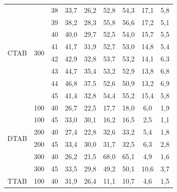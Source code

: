 \begin{table}[h]
{\begin{tabular}{ccccccccc}
        	\multirow{8}{*}{CTAB} & \multirow{8}{*}{300} &   38   &   33,7   &   26,2    &   52,8   &   54,3    &   17,1   &    5,8    \\
        	                      &                      &   39   &   38,2   &   28,3    &   55,8   &   56,6    &   17,2   &    5,1    \\
        	                      &                      &   40   &   40,0   &   29,7    &   52,5   &   54,0    &   15,7   &    5,5    \\
        	                      &                      &   41   &   41,7   &   31,9    &   52,7   &   53,0    &   14,8   &    5,4    \\
        	                      &                      &   42   &   42,9   &   32,8    &   53,7   &   53,2    &   14,1   &    6,3    \\
        	                      &                      &   43   &   44,7   &   35,4    &   53,2   &   52,9    &   13,8   &    6,8    \\
        	                      &                      &   44   &   46,8   &   37,5    &   52,6   &   50,9    &   13,2   &    6,9    \\
        	                      &                      &   45   &   41,4   &   32,8    &   54,4   &   55,2    &   15,4   &    5,8    \\ \midrule
        	\multirow{6}{*}{DTAB} &         100          &   40   &   26,7   &   22,5    &   17,7   &   18,0    &   6,0    &    1,9    \\
        	                      &         100          &   45   &   33,0   &   30,1    &   16,2   &   16,5    &   2,5    &    1,1    \\
        	                      &         200          &   40   &   27,4   &   22,8    &   32,6   &   33,2    &   5,4    &    1,8    \\
        	                      &         200          &   45   &   33,4   &   30,0    &   31,7   &   32,5    &   6,3    &    2,8    \\
        	                      &         300          &   40   &   26,2   &   21,5    &   68,0   &   65,1    &   4,9    &    1,6    \\
        	                      &         300          &   45   &   33,5   &   29,8    &   49,2   &   50,1    &   10,6   &    3,7    \\ \midrule
        	\multirow{6}{*}{TTAB} &         100          &   40   &   31,9   &   26,4    &   11,1   &   10,7    &   4,6    &    1,5    \\

\end{tabular}}
\end{table}
